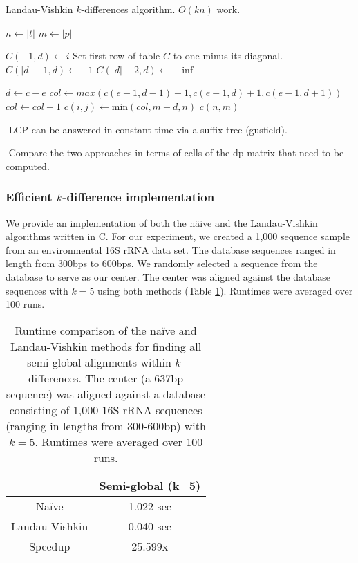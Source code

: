  \begin{algorithm}
 \caption{Landau-Vishkin $k$-differences algorithm. $O(kn)$ work.}\label{landau_vishkin}
 \begin{algorithmic}[1]
 \State $n\gets |t|$
 \State $m\gets |p|$

   \State $C(-1,d) \gets i$ \EndFor \Comment Set first row of table $C$ to one minus its diagonal. 
    \State $C(|d| - 1 ,d) \gets -1$
    \State $C(|d| - 2 ,d) \gets -\inf$
\EndFor

  \State $d \gets c - e$
  \State $col \gets max(c(e-1,d-1) + 1,c(e-1,d)+ 1,c(e-1,d+1))$
    \State $col \gets col + 1$
  \EndWhile
  \State $c(i,j) \gets \text{min}(col, m + d, n)$
\EndFor
\EndFor
\Return $c(n,m)$
\EndProcedure
\end{algorithmic}
\end{algorithm}



-LCP can be answered in constant time via a suffix tree (gusfield).

-Compare the two approaches in terms of cells of the dp matrix that need to be computed.

\subsubsection{Efficient $k$-difference implementation}
We provide an implementation of both the n\"aive and the Landau-Vishkin algorithms written in C.
For our experiment, we created a 1,000 sequence sample from an environmental 16S rRNA data set.
The database sequences ranged in length from 300bps to 600bps.
We randomly selected a sequence from the database to serve as our center. 
The center was aligned against the database sequences with $k=5$ using both methods (Table \ref{table:naive_vishkin}).
Runtimes were averaged over 100 runs.

\begin{center}
\begin{table}[h]
\centering
\begin{tabular}{c|c}
               & Semi-global (k=5) \\
\hline 
Na\"ive          & 1.022 sec  \\
Landau-Vishkin & 0.040 sec \\
\hline 
Speedup        & 25.599x
\end{tabular}
\caption{Runtime comparison of the na\"ive and Landau-Vishkin\cite{landau_introducing_1986} methods for finding all semi-global alignments within $k$-differences. The center (a 637bp sequence) was aligned against a database consisting of 1,000 16S rRNA sequences (ranging in lengths from 300-600bp) with $k=5$.  Runtimes were averaged over 100 runs.}
\label{table:naive_vishkin}
\end{table}
\end{center}

